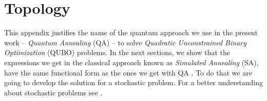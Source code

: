 
\chapter{Topology} %

This appendix justifies the name of the quantum approach we use in the present work -- \textit{Quantum Annealing} (QA) -- to solve \textit{Quadratic Unconstrained Binary Optimization} (QUBO) problems. In the next sections, we show that the expressions we get in the classical approach known as \textit{Simulated Annealing} (SA), have the same functional form as the ones we get with QA \cite{Kadowaki1998QuantumModel}. To do that we are going to develop the solution for a stochastic problem. For a better understanding about stochastic problems see \cite{Schneider2006StochasticOptimization}. 
\label{AppendixC} %
